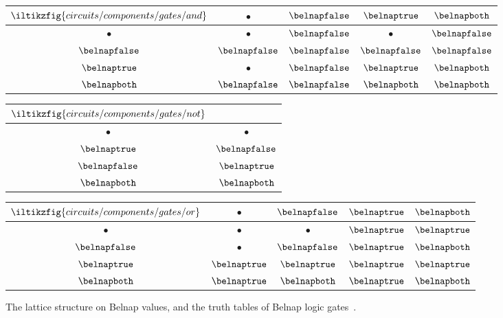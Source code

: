 \begin{figure*}
    \centering
    \quad
    \begin{tabular}{|c|cccc|}
        \hline
        \(\iltikzfig{circuits/components/gates/and}\) & \(\bullet\) & \(\belnapfalse\) & \(\belnaptrue\) & \(\belnapboth\) \\
        \hline
        \(\bullet\)  & \(\bullet\) & \(\belnapfalse\) & \(\bullet\) & \(\belnapfalse\) \\
        \(\belnapfalse\) & \(\belnapfalse\) & \(\belnapfalse\) & \(\belnapfalse\) & \(\belnapfalse\) \\
        \(\belnaptrue\) & \(\bullet\) & \(\belnapfalse\) & \(\belnaptrue\) & \(\belnapboth\) \\
        \(\belnapboth\) & \(\belnapfalse\) & \(\belnapfalse\) & \(\belnapboth\) & \(\belnapboth\) \\
        \hline
    \end{tabular}
    \quad
    \begin{tabular}{|c|c|}
        \hline
        \(\iltikzfig{circuits/components/gates/not}\) & \\
        \hline
        \(\bullet\) & \(\bullet\) \\
        \(\belnaptrue\) & \(\belnapfalse\) \\
        \(\belnapfalse\) & \(\belnaptrue\) \\
        \(\belnapboth\) & \(\belnapboth\) \\
        \hline
    \end{tabular}
    \quad
    \begin{tabular}{|c|cccc|}
        \hline
        \(\iltikzfig{circuits/components/gates/or}\) & \(\bullet\) & \(\belnapfalse\) & \(\belnaptrue\) & \(\belnapboth\) \\
        \hline
        \(\bullet\)  & \(\bullet\) & \(\bullet\) & \(\belnaptrue\) & \(\belnaptrue\) \\
        \(\belnapfalse\) & \(\bullet\) & \(\belnapfalse\) & \(\belnaptrue\) & \(\belnapboth\) \\
        \(\belnaptrue\) & \(\belnaptrue\) & \(\belnaptrue\) & \(\belnaptrue\) & \(\belnaptrue\) \\
        \(\belnapboth\) & \(\belnaptrue\) & \(\belnapboth\) & \(\belnaptrue\) & \(\belnapboth\) \\
        \hline
    \end{tabular}

    \caption{The lattice structure on Belnap values, and the truth tables
    of Belnap logic gates~\cite{belnap1977useful}.}
    \label{tab:truths}
\end{figure*}